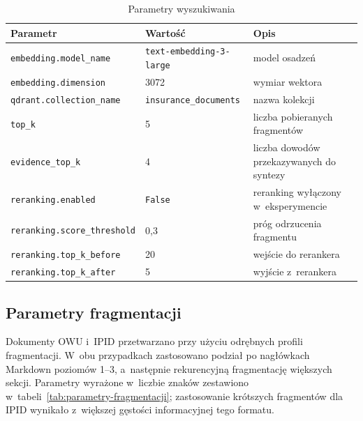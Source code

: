   \begin{table}[H]
    \caption{Parametry wyszukiwania}\label{tab:parametry-wyszukiwania}
    \centering
    \small
    \renewcommand{\arraystretch}{1.3}
    \begin{tabularx}{\textwidth}{@{} l l X @{}}
      \toprule
      \textbf{Parametr}
      & \textbf{Wartość}
      & \textbf{Opis}                                                              \\
      \midrule
      \texttt{embedding.model\_name}
      & \texttt{text-embedding-3-large} & model osadzeń                            \\
      \texttt{embedding.dimension}
      & 3072                            & wymiar wektora                           \\
      \texttt{qdrant.collection\_name}
      & \texttt{insurance\_documents}   & nazwa kolekcji                           \\
      \texttt{top\_k}
      & 5                               & liczba pobieranych fragmentów            \\
      \texttt{evidence\_top\_k}
      & 4                               & liczba dowodów przekazywanych do syntezy \\
      \texttt{reranking.enabled}
      & \texttt{False}                  & reranking wyłączony w~eksperymencie      \\
      \texttt{reranking.score\_threshold}
      & 0{,}3                            & próg odrzucenia fragmentu                \\
      \texttt{reranking.top\_k\_before}
      & 20                              & wejście do rerankera                     \\
      \texttt{reranking.top\_k\_after}
      & 5                               & wyjście z~rerankera                      \\
      \bottomrule
    \end{tabularx}
  \end{table}

  \subsection{Parametry fragmentacji}\label{subsec:parametry-fragmentacji}

  Dokumenty OWU i~IPID przetwarzano przy użyciu odrębnych profili fragmentacji.
  W~obu przypadkach zastosowano podział po nagłówkach Markdown poziomów 1--3,
  a~następnie rekurencyjną fragmentację większych sekcji. Parametry wyrażone
  w~liczbie znaków zestawiono w~tabeli~\ref{tab:parametry-fragmentacji};
  zastosowanie krótszych fragmentów dla IPID wynikało z~większej gęstości
  informacyjnej tego formatu.

